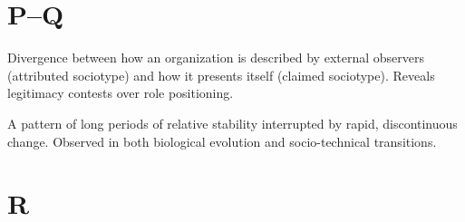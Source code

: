 \documentclass[../main.tex]{subfiles}
\begin{document}
\section*{P--Q}

\begin{description}[leftmargin=0.5cm, style=nextline]

\item[Perception Gap] Divergence between how an organization is described by external observers (attributed sociotype) and how it presents itself (claimed sociotype). Reveals legitimacy contests over role positioning.

\item[Punctuated Equilibrium] A pattern of long periods of relative stability interrupted by rapid, discontinuous change. Observed in both biological evolution and socio-technical transitions.

\end{description}

\section*{R}
\end{document}
